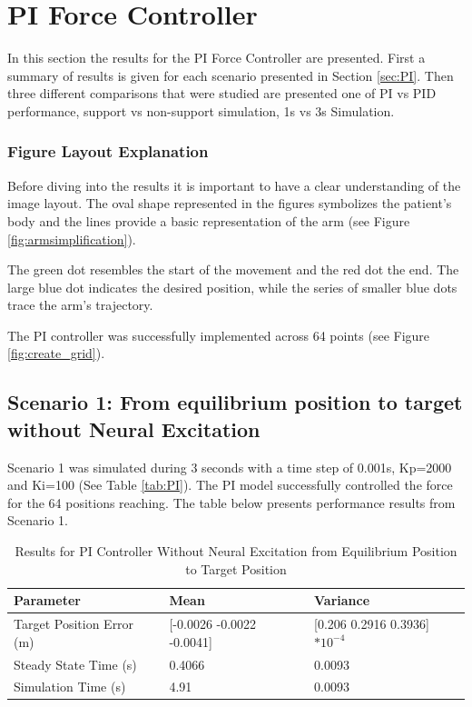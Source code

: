 \section{PI Force Controller}
In this section the results for the PI Force Controller are presented. First a summary of results is given for each scenario presented in Section \ref{sec:PI}. Then three different comparisons that were studied are presented one of PI vs PID performance, support vs non-support simulation, 1s vs 3s Simulation. 

\subsubsection{Figure Layout Explanation}
Before diving into the results it is important to have a clear understanding of the image layout. The oval shape represented in the figures symbolizes the patient's body and the lines provide a basic representation of the arm (see Figure \ref{fig:armsimplification}). 

The green dot resembles the start of the movement and the red dot the end. The large blue dot indicates the desired position, while the series of smaller blue dots trace the arm's trajectory. 

The PI controller was successfully implemented across 64 points (see Figure \ref{fig:create_grid}).

\subsection{Scenario 1: From equilibrium position to target without Neural Excitation}
Scenario 1 was simulated during 3 seconds with a time step of 0.001s, Kp=2000 and Ki=100 (See Table \ref{tab:PI}).
The PI model successfully controlled the force for the 64 positions reaching. The table below presents performance results from Scenario 1.

\begin{table}[h]
    \centering
    \caption{Results for PI Controller Without Neural Excitation from Equilibrium Position to Target Position}
    \scriptsize
    \begin{tabularx}{\textwidth}{|l|X|X|}
        \hline
        \textbf{Parameter} & \textbf{Mean} & \textbf{Variance} \\        
        \hline

        Target Position Error (m) & [-0.0026 -0.0022 -0.0041] & [0.206 0.2916 0.3936]$*10^{-4}$ \\
        Steady State Time (s) & 0.4066 & 0.0093 \\
        Simulation Time (s) & 4.91 & 0.0093        \\
        \hline

    \end{tabularx}

    \label{tab:PINNE}
\end{table}

